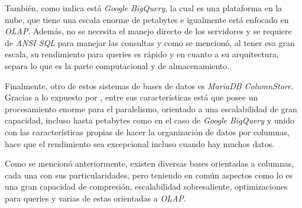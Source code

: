 	También, como indica \textcite{husen2021} está \textit{Google BigQuery}, la cual es una plataforma en la nube, que tiene una escala enorme de petabytes e igualmente está enfocado en \textit{OLAP}. Además, no se necesita el manejo directo de los servidores y se requiere de \textit{ANSI SQL} para manejar las consultas y como se mencionó, al tener esa gran escala, su rendimiento para queries es rápido y en cuanto a su arquitectura, separa lo que es la parte computacional y de almacenamiento.

	Finalmente, otro de estos sistemas de bases de datos es \textit{MariaDB ColumnStore}. Gracias a lo expuesto por \textcite{ilic2022}, entre sus características está que posee un procesamiento enorme para el paralelismo, orientado a una escalabilidad de gran capacidad, incluso hasta petabytes como en el caso de \textit{Google BigQuery} y unido con las características propias de hacer la organización de datos por columnas, hace que el rendimiento sea excepcional incluso cuando hay muchos datos.

	Como se mencionó anteriormente, existen diversas bases orientadas a columnas, cada una con sus particularidades, pero teniendo en común aspectos como lo es una gran capacidad de compresión, escalabilidad sobresaliente, optimizaciones para queries y varias de estas orientadas a \textit{OLAP}.

